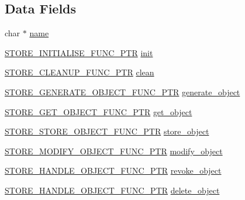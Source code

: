 \subsection*{Data Fields}
\begin{DoxyCompactItemize}
\item 
char $\ast$ \hyperlink{structstore__method__st_a5ac083a645d964373f022d03df4849c8}{name}
\item 
\hyperlink{store_8h_a65d3d9d896500c4a1886e8b4d482e3c7}{S\+T\+O\+R\+E\+\_\+\+I\+N\+I\+T\+I\+A\+L\+I\+S\+E\+\_\+\+F\+U\+N\+C\+\_\+\+P\+TR} \hyperlink{structstore__method__st_afdade84c134d3442c9bce96c6a8dd9fe}{init}
\item 
\hyperlink{store_8h_a32f941e0652d20587f7e95f21cb65cb2}{S\+T\+O\+R\+E\+\_\+\+C\+L\+E\+A\+N\+U\+P\+\_\+\+F\+U\+N\+C\+\_\+\+P\+TR} \hyperlink{structstore__method__st_a226bf426b331ebaccb280fb8f745bb3a}{clean}
\item 
\hyperlink{store_8h_a8762af252c1846a5174ef0d645c3daa3}{S\+T\+O\+R\+E\+\_\+\+G\+E\+N\+E\+R\+A\+T\+E\+\_\+\+O\+B\+J\+E\+C\+T\+\_\+\+F\+U\+N\+C\+\_\+\+P\+TR} \hyperlink{structstore__method__st_adba24d34986f54b71189792d3952deca}{generate\+\_\+object}
\item 
\hyperlink{store_8h_a019a0390772e92ba27f2ce58a3ffc7eb}{S\+T\+O\+R\+E\+\_\+\+G\+E\+T\+\_\+\+O\+B\+J\+E\+C\+T\+\_\+\+F\+U\+N\+C\+\_\+\+P\+TR} \hyperlink{structstore__method__st_a0f5bf6ad8f649395a46e6e0f9db9635c}{get\+\_\+object}
\item 
\hyperlink{store_8h_a974defe0e33dd3aa3ffb8ae9f4883220}{S\+T\+O\+R\+E\+\_\+\+S\+T\+O\+R\+E\+\_\+\+O\+B\+J\+E\+C\+T\+\_\+\+F\+U\+N\+C\+\_\+\+P\+TR} \hyperlink{structstore__method__st_a595188b731cfac622ebda0ed11e32945}{store\+\_\+object}
\item 
\hyperlink{store_8h_ae57f8536b43f74a455c1c096e50e1fb5}{S\+T\+O\+R\+E\+\_\+\+M\+O\+D\+I\+F\+Y\+\_\+\+O\+B\+J\+E\+C\+T\+\_\+\+F\+U\+N\+C\+\_\+\+P\+TR} \hyperlink{structstore__method__st_a67f7a03df89206eb6630e315d4ae7065}{modify\+\_\+object}
\item 
\hyperlink{store_8h_a1be264352e054497042e8e574b15a42b}{S\+T\+O\+R\+E\+\_\+\+H\+A\+N\+D\+L\+E\+\_\+\+O\+B\+J\+E\+C\+T\+\_\+\+F\+U\+N\+C\+\_\+\+P\+TR} \hyperlink{structstore__method__st_a46056dda02ace42ea28d75daaee83a37}{revoke\+\_\+object}
\item 
\hyperlink{store_8h_a1be264352e054497042e8e574b15a42b}{S\+T\+O\+R\+E\+\_\+\+H\+A\+N\+D\+L\+E\+\_\+\+O\+B\+J\+E\+C\+T\+\_\+\+F\+U\+N\+C\+\_\+\+P\+TR} \hyperlink{structstore__method__st_a04e82ed2a3f93def50404b6b2b8013c4}{delete\+\_\+object}

\end{DoxyCompactItemize}
